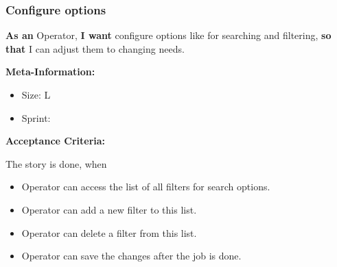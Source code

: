 \subsubsection{Configure options}

\textbf{As an} Operator,\hfill\break
\textbf{I want} configure options like for searching and filtering,\hfill\break
\textbf{so that} I can adjust them to changing needs.

\textbf{Meta-Information:}
\begin{itemize}
    \item Size: L
    \item Sprint: 
\end{itemize}

\textbf{Acceptance Criteria:}

The story is done, when
\begin{itemize}
    \item Operator can access the list of all filters for search options.
    \item Operator can add a new filter to this list.
    \item Operator can delete a filter from this list.
    \item Operator can save the changes after the job is done.
\end{itemize}
